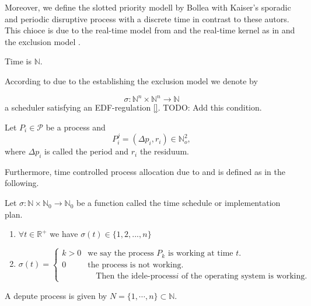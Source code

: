 Moreover, we define the slotted priority modell by Bollea with Kaiser's sporadic and periodic disruptive process with a discrete time in contrast to these autors.
This chioce is due to the real-time model from \cite{PROSA_schedubility_analysis} and the real-time kernel as in  \cite[chp. 5.3]{B} and the exclusion model  \cite[p.12]{B}.

\begin{definition}
	Time is $\mathbb{N}$.
\end{definition}

According to \cite[]{} due to the establishing the exclusion model we denote by

\begin{equation}
\sigma: \mathbb{N}^n \times \mathbb{N}^n\longrightarrow \mathbb{N} 
\end{equation}
a scheduler satisfying an EDF-regulation \ref{}. TODO: Add this condition.


\begin{definition}
Let $P_i\in \mathcal{P}$ be a process and 
\begin{equation}
P^j_i = ( \Delta p_i, r_i) \in \mathbb{N}_o^2,  
\end{equation}
where $\Delta p_i$ is called the period and $r_i$ the residuum. 
\end{definition}
Furthermore, time controlled process allocation due to \cite{B} and \cite[p. 34]{K} is defined as in the following.

\begin{definition}
Let $\sigma: \mathbb{N} \times \mathbb{N}_0 \rightarrow \mathbb{N}_0$ be a function called the time schedule or implementation plan.
\begin{enumerate}
\item $\forall t \in \mathbb{R}^+$ we have $\sigma(t)\in \{1,2,...,n\}$
\item \begin{equation}
		\sigma(t) =
		\begin{cases}
			k > 0 & \text{we say the process $P_k$ is working at time $t$.}\\
			0 & \text{the process is not working.}\\
			  &\quad  \text{Then the idele-process$i$ of the operating system is working.}
		\end{cases}       
\end{equation}
\end{enumerate}
\end{definition}

A depute process is given by $ N = \{1, \cdots, n\}\subset \mathbb{N}$. 

